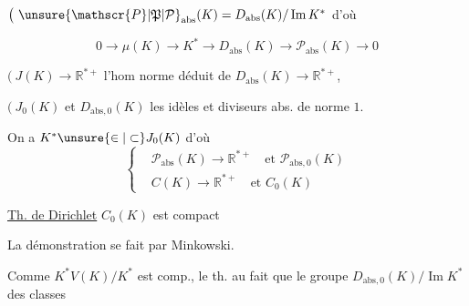 $\bigl(\ {\unsure{\mathscr{P}|\mathfrak{P}|\mathcal{P}}}_{\mathrm{abs}}(K)=D_{\mathrm{abs}}(K)/\operatorname{Im}K^*$ d'où

\[
0\longrightarrow\mu(K)\longrightarrow K^*\longrightarrow D_{\mathrm{abs}}(K)\longrightarrow\mathscr{P}_{\mathrm{abs}}(K)\longrightarrow0
\]

$\bigl(\ J(K)\longrightarrow\mathbb R^{*+}$ l'hom norme déduit de $D_{\mathrm{abs}}(K)\longrightarrow\mathbb R^{*+}$,

$\bigl(\ J_0(K)$ et $D_{\mathrm{abs},0}(K)$ les idèles et diviseurs abs. de norme $1$.

On a $K^*\unsure{\in|\subset}J_0(K)$ d'où
\[
\left\{\begin{aligned}
&\mathscr{P}_{\mathrm{abs}}(K)\longrightarrow\mathbb R^{*+}\quad\text{et }\mathscr{P}_{\mathrm{abs},0}(K)\\
&C(K)\longrightarrow\mathbb R^{*+}\quad\text{et }C_0(K)
\end{aligned}\right.
\]


\uline{Th. de Dirichlet} $C_0(K)$ est compact

La démonstration se fait par Minkowski.

Comme $K^*V(K)/K^*$ est comp., le th.  au fait que le groupe $D_{\mathrm{abs},0}(K)/\operatorname{Im}K^*$ des classes
